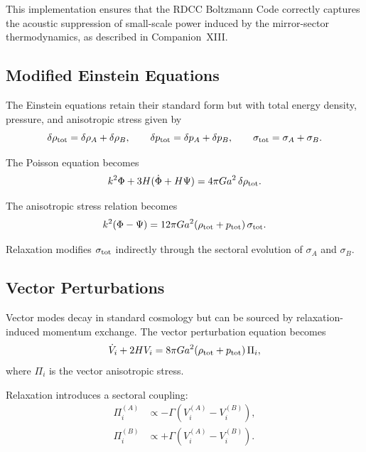 \documentclass[11pt,a4paper]{article}
\begin{document}
This implementation ensures that the RDCC Boltzmann Code correctly captures the acoustic
suppression of small-scale power induced by the mirror-sector thermodynamics, as described in
Companion~XIII.

\subsection{Modified Einstein Equations}

The Einstein equations retain their standard form but with total energy density, pressure, and anisotropic stress given by
\begin{equation}
\delta\rho_{\rm tot} = \delta\rho_A + \delta\rho_B, \qquad
\delta p_{\rm tot} = \delta p_A + \delta p_B, \qquad
\sigma_{\rm tot} = \sigma_A + \sigma_B.
\end{equation}

The Poisson equation becomes
\begin{equation}
k^2\Phi + 3H(\dot{\Phi} + H\Psi)
= 4\pi G a^2\,\delta\rho_{\rm tot}.
\end{equation}

The anisotropic stress relation becomes
\begin{equation}
k^2(\Phi - \Psi)
= 12\pi G a^2 (\rho_{\rm tot} + p_{\rm tot})\,\sigma_{\rm tot}.
\end{equation}

Relaxation modifies $\sigma_{\rm tot}$ indirectly through the sectoral evolution of $\sigma_A$ and $\sigma_B$.

\subsection{Vector Perturbations}

Vector modes decay in standard cosmology but can be sourced by relaxation-induced momentum exchange. The vector perturbation equation becomes
\begin{equation}
\dot{V}_i + 2H V_i = 8\pi G a^2 (\rho_{\rm tot} + p_{\rm tot})\,\Pi_i,
\end{equation}
where $\Pi_i$ is the vector anisotropic stress.

Relaxation introduces a sectoral coupling:
\begin{align}
\Pi^{(A)}_i &\propto -\Gamma(V^{(A)}_i - V^{(B)}_i), \\
\Pi^{(B)}_i &\propto +\Gamma(V^{(A)}_i - V^{(B)}_i).
\end{align}
\end{document}
